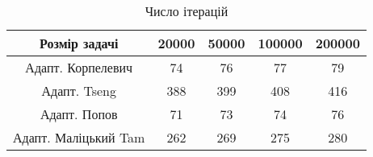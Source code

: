 \begin{table}[H]
	\centering
	\begin{tabular}{|c||c|c|c|c|}\hline
		Розмір задачі & 20000 & 50000 & 100000 & 200000 \\ \hline \hline
		Адапт. Корпелевич & 74 & 76 & 77 & 79 \\ \hline
		Адапт. Tseng & 388 & 399 & 408 & 416 \\ \hline
		Адапт. Попов & 71 & 73 & 74 & 76 \\ \hline
		Адапт. Маліцький Tam & 262 & 269 & 275 & 280 \\ \hline
	\end{tabular}
	\caption{Число ітерацій}
\end{table}
